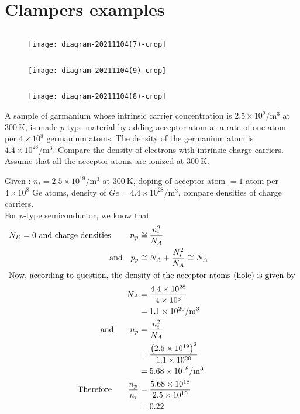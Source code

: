 \section{Clampers examples}
\begin{example}$\left. \right. $\\
	\begin{figure}[H]
		\centering
		\texttt{[image: diagram-20211104(7)-crop]}
	\end{figure}
\end{example}
 
\begin{example}$\left. \right. $\\
\begin{figure}[H]
\centering
\texttt{[image: diagram-20211104(9)-crop]}
\end{figure}
\end{example}
\begin{example}$\left. \right. $\\
\begin{figure}[H]
\centering
\texttt{[image: diagram-20211104(8)-crop]}
\end{figure}
\end{example}
\begin{exercise}
	A sample of garmanium whose intrinsic carrier concentration is $2.5 \times 10^{9} / \mathrm{m}^{3}$ at $300 \mathrm{~K}$, is made $p$-type material by adding acceptor atom at a rate of one atom per $4 \times 10^{8}$ germanium atoms. The density of the germanium atom is $4.4 \times 10^{28} / \mathrm{m}^{3}$. Compare the density of electrons with intrinsic charge carriers. Assume that all the acceptor atoms are ionized at $300 \mathrm{~K}$.
\end{exercise}
\begin{answer}
	Given : $n_{t}=2.5 \times 10^{19} / \mathrm{m}^{3}$ at $300 \mathrm{~K}$, doping of acceptor atom $=1$ atom per $4 \times 10^{8}$ Ge atoms, density of $G e=4.4 \times 10^{28} / \mathrm{m}^{3}$, compare densities of charge carriers.\\
	For $p$-type semiconductor, we know that
	\begin{align*}
	N_{D}=0 \text { and charge densities }\qquad n_{p} &\cong \frac{n_{i}^{2}}{N_{A}}\\
	\text{and}\quad p_{p} &\cong N_{A}+\frac{N_{i}^{2}}{N_{A}} \cong N_{A}\\
	\intertext{Now, according to question, the density of the acceptor atoms (hole) is given by}
	N_{A} &=\frac{4.4 \times 10^{28}}{4 \times 10^{8}} \\
	&=1.1 \times 10^{20} / \mathrm{m}^{3} \\
	\text{and}\qquad n_{p} &=\frac{n_{i}^{2}}{N_{A}} \\
	&=\frac{\left(2.5 \times 10^{19}\right)^{2}}{1.1 \times 10^{20}} \\
	&=5.68 \times 10^{18} / \mathrm{m}^{3} \\
	\text{Therefore}\qquad \frac{n_{p}}{n_{i}} &=\frac{5.68 \times 10^{18}}{2.5 \times 10^{19}} \\
	&=0.22
	\end{align*}
\end{answer}
